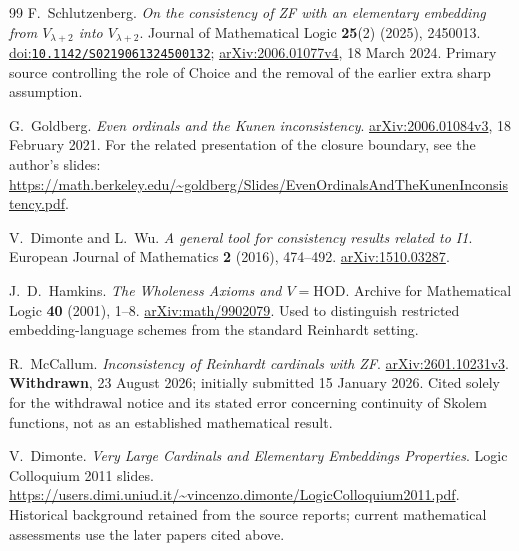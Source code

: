 \documentclass[11pt,letterpaper]{article}
\theoremstyle{definition}
\newcommand{\HOD}{\mathrm{HOD}}
\newcommand{\arxiv}[1]{\href{https://arxiv.org/abs/#1}{arXiv:#1}}
\newcommand{\doi}[1]{\href{https://doi.org/#1}{doi:\nolinkurl{#1}}}
\begin{document}
\begin{thebibliography}{99}
F.~Schlutzenberg.
\emph{On the consistency of ZF with an elementary embedding from $V_{\lambda+2}$ into $V_{\lambda+2}$}.
Journal of Mathematical Logic \textbf{25}(2) (2025), 2450013.
\doi{10.1142/S0219061324500132}; \arxiv{2006.01077v4}, 18 March 2024.
Primary source controlling the role of Choice and the removal of the earlier extra sharp assumption.

G.~Goldberg. \emph{Even ordinals and the Kunen inconsistency}.
\arxiv{2006.01084v3}, 18 February 2021.
For the related presentation of the closure boundary, see the author's slides:
\url{https://math.berkeley.edu/~goldberg/Slides/EvenOrdinalsAndTheKunenInconsistency.pdf}.

V.~Dimonte and L.~Wu.
\emph{A general tool for consistency results related to I1}.
European Journal of Mathematics \textbf{2} (2016), 474--492.
\arxiv{1510.03287}.

J.~D.~Hamkins. \emph{The Wholeness Axioms and $V=\HOD$}.
Archive for Mathematical Logic \textbf{40} (2001), 1--8.
\arxiv{math/9902079}.
Used to distinguish restricted embedding-language schemes from the standard Reinhardt setting.

R.~McCallum. \emph{Inconsistency of Reinhardt cardinals with ZF}.
\arxiv{2601.10231v3}. \textbf{Withdrawn}, 23 August 2026; initially submitted 15 January 2026.
Cited solely for the withdrawal notice and its stated error concerning continuity of Skolem functions, not as an established mathematical result.

V.~Dimonte. \emph{Very Large Cardinals and Elementary Embeddings Properties}.
Logic Colloquium 2011 slides.
\url{https://users.dimi.uniud.it/~vincenzo.dimonte/LogicColloquium2011.pdf}.
Historical background retained from the source reports; current mathematical assessments use the later papers cited above.

\end{thebibliography}
\end{document}
